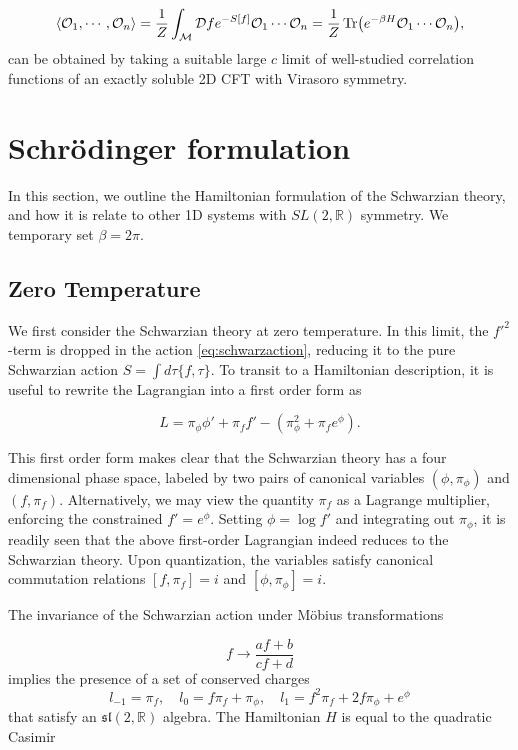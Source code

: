 \begin{equation}
\langle \mathcal{O}_1,\cdots,\mathcal{O}_n\rangle = \frac{1}{Z}\int_\mathcal{M}{\mathcal{D}f e^{-S[f]}\mathcal{O}_1\cdots\mathcal{O}_n} = \frac{1}{Z}\Tr(e^{-\beta H} \mathcal{O}_1\cdots\mathcal{O}_n),
\end{equation}
can be obtained by taking a suitable large $c$ limit of well-studied correlation functions of an exactly soluble 2D CFT with Virasoro symmetry.

\section{Schrödinger formulation}
In this section, we outline the Hamiltonian formulation of the Schwarzian theory, and how it is relate to other 1D systems with $SL(2,\mathbb{R})$ symmetry. We temporary set $\beta = 2\pi$.
\subsection{Zero Temperature}
We first consider the Schwarzian theory at zero temperature. In this limit, the $f'^2$-term is dropped in the action \eqref{eq:schwarzaction}, reducing it to the pure Schwarzian action $S = \int{d\tau\{f,\tau\}}$. To transit to a Hamiltonian description, it is useful to rewrite the Lagrangian into a first order form as

\begin{equation}
L = \pi_\phi\phi'+\pi_f f' - (\pi_\phi^2 + \pi_f e^\phi).
\end{equation}

This first order form makes clear that the Schwarzian theory has a four dimensional phase space, labeled by two pairs of canonical variables $(\phi,\pi_\phi)$ and $(f,\pi_f)$. Alternatively, we may view the quantity $\pi_f$ as a Lagrange multiplier, enforcing the constrained $f' = e^\phi$. Setting $\phi = \log f'$ and integrating out $\pi_\phi$, it is readily seen that the above first-order Lagrangian indeed reduces to the Schwarzian theory. Upon quantization, the variables satisfy canonical commutation relations $[f,\pi_f]=i$ and $[\phi,\pi_\phi] = i$.

The invariance of the Schwarzian action under Möbius transformations

\begin{equation}
f\rightarrow\frac{af+b}{cf+d}
\end{equation}
implies the presence of a set of conserved charges
\begin{equation}
l_{-1} = \pi_f,\quad l_0=f\pi_f+\pi_\phi,\quad l_1=f^2\pi_f + 2f\pi_\phi + e^\phi
\end{equation}
that satisfy an $\mathfrak{sl}(2,\mathbb{R})$ algebra. The Hamiltonian $H$ is equal to the quadratic Casimir

